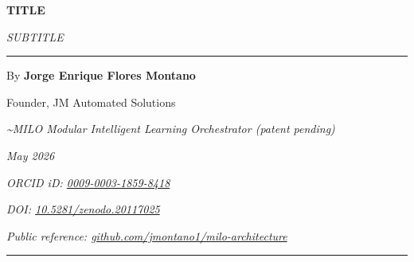 \documentclass[11pt,letterpaper,oneside]{article}
\newcommand{\milotitle}{TITLE}
\newcommand{\milosubtitle}{SUBTITLE}
\newcommand{\milodate}{May 2026}
\begin{document}
\thispagestyle{titlepage}
\begin{center}
\vspace*{0.2in}
{\sffamily\Large\bfseries\color{milonavy} \milotitle\par}
\vspace{0.15in}
{\itshape\normalsize \milosubtitle\par}
\vspace{0.18in}
{\color{milonavy}\rule{0.35\textwidth}{0.8pt}\par}
\vspace{0.18in}
{\large By \textbf{Jorge Enrique Flores Montano}\par}
{\normalsize Founder, JM Automated Solutions\par}
{\small\itshape\textcolor{black!70}{\textasciitilde MILO\texttrademark{} \textemdash{} Modular Intelligent Learning Orchestrator (patent pending)}\par}
{\small\itshape\textcolor{black!70}{\milodate}\par}
{\small\itshape\textcolor{black!70}{ORCID iD: \href{https://orcid.org/0009-0003-1859-8418}{0009-0003-1859-8418}}\par}
{\small\itshape\textcolor{black!70}{DOI: \href{https://doi.org/10.5281/zenodo.20117025}{10.5281/zenodo.20117025}}\par}
{\small\itshape\textcolor{black!70}{Public reference: \href{https://github.com/jmontano1/milo-architecture}{github.com/jmontano1/milo-architecture}}\par}
\vspace{0.15in}
{\color{milonavy}\rule{\textwidth}{0.6pt}\par}
\end{center}


\end{document}
